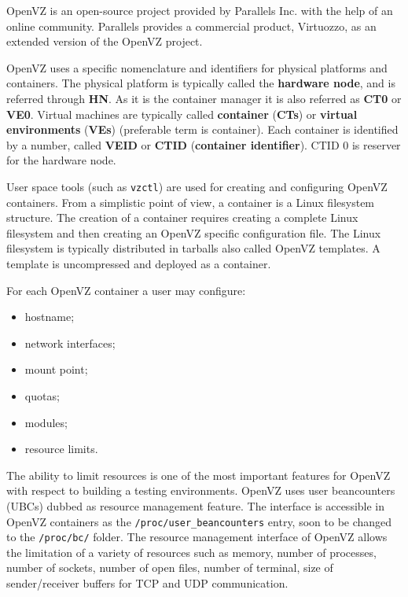OpenVZ is an open-source project provided by Parallels Inc. with the help of
an online community. Parallels provides a commercial product, Virtuozzo, as an
extended version of the OpenVZ project.

OpenVZ uses a specific nomenclature and identifiers for physical platforms and
containers. The physical platform is typically called the \textbf{hardware
node}, and is referred through \textbf{HN}. As it is the container manager it
is also referred as \textbf{CT0} or \textbf{VE0}. Virtual machines are
typically called \textbf{container} (\textbf{CTs}) or \textbf{virtual
environments} (\textbf{VEs}) (preferable term is container). Each container is
identified by a number, called \textbf{VEID} or \textbf{CTID}
(\textbf{container identifier}). CTID 0 is reserver for the hardware node.

User space tools (such as \texttt{vzctl}) are used for creating and
configuring OpenVZ containers. From a simplistic point of view, a container is
a Linux filesystem structure. The creation of a container requires creating a
complete Linux filesystem and then creating an OpenVZ specific configuration
file. The Linux filesystem is typically distributed in tarballs also called
OpenVZ templates. A template is uncompressed and deployed as a container.

For each OpenVZ container a user may configure:

\begin{itemize}
  \item hostname;
  \item network interfaces;
  \item mount point;
  \item quotas;
  \item modules;
  \item resource limits.
\end{itemize}

The ability to limit resources is one of the most important features for
OpenVZ with respect to building a testing environments. OpenVZ uses user
beancounters (UBCs) dubbed as resource management feature. The interface is
accessible in OpenVZ containers as the \texttt{/proc/user\_beancounters} entry,
soon to be changed to the \texttt{/proc/bc/} folder. The resource management
interface of OpenVZ allows the limitation of a variety of resources such as
memory, number of processes, number of sockets, number of open files, number
of terminal, size of sender/receiver buffers for TCP and UDP communication.

